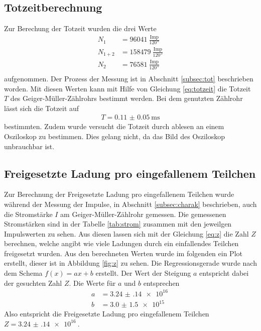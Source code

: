 \subsection{Totzeitberechnung}
Zur Berechung der Totzeit wurden die drei Werte
\begin{align*}
  N_1 &= \SI{96041}{\frac{\text{Imp}}{120\second}} \\
  N_{1+2} &= \SI{158479}{\frac{\text{Imp}}{120\second}} \\
  N_2 &= \SI{76581}{\frac{\text{Imp}}{120\second}} \\
  \label{eq:tot}
\end{align*}
aufgenommen.
Der Prozess der Messung ist in Abschnitt \ref{subsec:tot} beschrieben worden.
Mit diesen Werten kann mit Hilfe von Gleichung \eqref{eq:totzeit} die Totzeit $T$ des Geiger-Müller-Zählrohrs bestimmt werden.
Bei dem genutzten Zählrohr lässt sich die Totzeit auf 
\begin{align*}
  T = \SI{0.11(5)}{\milli\second}
\end{align*}
bestimmten.
Zudem wurde versucht die Totzeit durch ablesen an einem Osziloskop zu bestimmen.
Dies gelang nicht, da das Bild des Osziloskop unbrauchbar ist.
\FloatBarrier
\subsection{Freigesetzte Ladung pro eingefallenem Teilchen}
Zur Berechnung der Freigesetzte Ladung pro eingefallenem Teilchen wurde während der Messung der Impulse, in Abschnitt \ref{subsec:charak} beschrieben, auch die Stromstärke $I$ am Geiger-Müller-Zählrohr gemessen.
Die gemessenen Stromstärken sind in der Tabelle \ref{tab:strom} zusammen mit den jeweilgen Impulswerten zu sehen.
Aus diesen lassen sich mit der Gleichung \eqref{eq:z} die Zahl $Z$ berechnen, welche angibt wie viele Ladungen durch ein einfallendes Teilchen freigesetzt wurden.
Aus den berechneten Werten wurde im folgenden ein Plot erstellt, dieser ist in Abbildung \ref{fig:z} zu sehen.
Die Regressionsgerade wurde nach dem Schema $f(x)=ax+b$ erstellt.
Der Wert der Steigung $a$ entspricht dabei der gesuchten Zahl $Z$.
Die Werte für $a$ und $b$ entsprechen
\begin{align*}
  a &= \SI{3.24(14)e+16}{} \\
  b &= \SI{3.0(15)e+15}{}
\end{align*}
Also entspricht die Freigesetzte Ladung pro eingefallenem Teilchen $Z = \SI{3.24(14)e+16}{}$.

